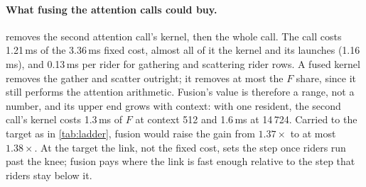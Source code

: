 \paragraph{What fusing the attention calls could buy.} 
removes the second attention call's kernel, then the whole call. The call costs
1.21\,ms of the 3.36\,ms fixed cost, almost all of it the kernel and its launches
(1.16\,ms), and 0.13\,ms per rider for gathering and scattering rider rows. A
fused kernel removes the gather and scatter outright; it removes at most the
$F$ share, since it still performs the attention arithmetic. Fusion's value is
therefore a range, not a number, and its upper end grows with context: with
one resident, the second call's kernel costs 1.3\,ms of $F$ at context 512
and 1.6\,ms at 14\,724. Carried to the target as in \cref{tab:ladder}, fusion would raise the gain
from $1.37\times$ to at most $1.38\times$. At the target the link, not the
fixed cost, sets the step once riders run past the knee; fusion pays where
the link is fast enough relative to the step that riders stay below it.
